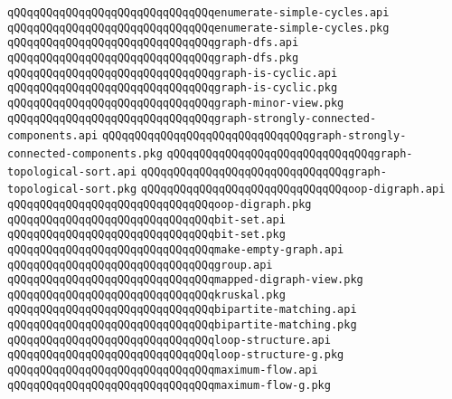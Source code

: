 \verb|qQQqqQQqqQQqqQQqqQQqqQQqqQQqqQQqenumerate-simple-cycles.api|\newline
\verb|qQQqqQQqqQQqqQQqqQQqqQQqqQQqqQQqenumerate-simple-cycles.pkg|\newline
\verb|qQQqqQQqqQQqqQQqqQQqqQQqqQQqqQQqgraph-dfs.api|\newline
\verb|qQQqqQQqqQQqqQQqqQQqqQQqqQQqqQQqgraph-dfs.pkg|\newline
\verb|qQQqqQQqqQQqqQQqqQQqqQQqqQQqqQQqgraph-is-cyclic.api|\newline
\verb|qQQqqQQqqQQqqQQqqQQqqQQqqQQqqQQqgraph-is-cyclic.pkg|\newline
\verb|qQQqqQQqqQQqqQQqqQQqqQQqqQQqqQQqgraph-minor-view.pkg|\newline
\verb|qQQqqQQqqQQqqQQqqQQqqQQqqQQqqQQqgraph-strongly-connected-components.api|\newline
\verb|qQQqqQQqqQQqqQQqqQQqqQQqqQQqqQQqgraph-strongly-connected-components.pkg|\newline
\verb|qQQqqQQqqQQqqQQqqQQqqQQqqQQqqQQqgraph-topological-sort.api|\newline
\verb|qQQqqQQqqQQqqQQqqQQqqQQqqQQqqQQqgraph-topological-sort.pkg|\newline
\verb|qQQqqQQqqQQqqQQqqQQqqQQqqQQqqQQqoop-digraph.api|\newline
\verb|qQQqqQQqqQQqqQQqqQQqqQQqqQQqqQQqoop-digraph.pkg|\newline
\verb|qQQqqQQqqQQqqQQqqQQqqQQqqQQqqQQqbit-set.api|\newline
\verb|qQQqqQQqqQQqqQQqqQQqqQQqqQQqqQQqbit-set.pkg|\newline
\verb|qQQqqQQqqQQqqQQqqQQqqQQqqQQqqQQqmake-empty-graph.api|\newline
\verb|qQQqqQQqqQQqqQQqqQQqqQQqqQQqqQQqgroup.api|\newline
\verb|qQQqqQQqqQQqqQQqqQQqqQQqqQQqqQQqmapped-digraph-view.pkg|\newline
\verb|qQQqqQQqqQQqqQQqqQQqqQQqqQQqqQQqkruskal.pkg|\newline
\verb|qQQqqQQqqQQqqQQqqQQqqQQqqQQqqQQqbipartite-matching.api|\newline
\verb|qQQqqQQqqQQqqQQqqQQqqQQqqQQqqQQqbipartite-matching.pkg|\newline
\verb|qQQqqQQqqQQqqQQqqQQqqQQqqQQqqQQqloop-structure.api|\newline
\verb|qQQqqQQqqQQqqQQqqQQqqQQqqQQqqQQqloop-structure-g.pkg|\newline
\verb|qQQqqQQqqQQqqQQqqQQqqQQqqQQqqQQqmaximum-flow.api|\newline
\verb|qQQqqQQqqQQqqQQqqQQqqQQqqQQqqQQqmaximum-flow-g.pkg|\newline
